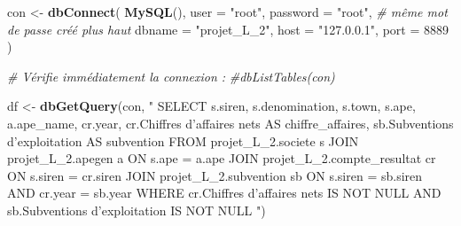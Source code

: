 \documentclass[mstat,12pt]{unswthesis}
\newenvironment{Shaded}{\begin{snugshade}}{\end{snugshade}}
\newcommand{\AttributeTok}[1]{\textcolor[rgb]{0.13,0.29,0.53}{#1}}
\newcommand{\CommentTok}[1]{\textcolor[rgb]{0.56,0.35,0.01}{\textit{#1}}}
\newcommand{\DecValTok}[1]{\textcolor[rgb]{0.00,0.00,0.81}{#1}}
\newcommand{\FunctionTok}[1]{\textcolor[rgb]{0.13,0.29,0.53}{\textbf{#1}}}
\newcommand{\NormalTok}[1]{#1}
\newcommand{\OtherTok}[1]{\textcolor[rgb]{0.56,0.35,0.01}{#1}}
\newcommand{\StringTok}[1]{\textcolor[rgb]{0.31,0.60,0.02}{#1}}
\begin{document}
\begin{Shaded}
\begin{Highlighting}[]
\NormalTok{con }\OtherTok{\textless{}{-}} \FunctionTok{dbConnect}\NormalTok{(}
  \FunctionTok{MySQL}\NormalTok{(),}
  \AttributeTok{user =} \StringTok{"root"}\NormalTok{,}
  \AttributeTok{password =} \StringTok{"root"}\NormalTok{, }\CommentTok{\# même mot de passe créé plus haut}
  \AttributeTok{dbname =} \StringTok{"projet\_L\_2"}\NormalTok{,}
  \AttributeTok{host =} \StringTok{"127.0.0.1"}\NormalTok{,}
  \AttributeTok{port =} \DecValTok{8889}
\NormalTok{)}

\CommentTok{\# Vérifie immédiatement la connexion :}
\CommentTok{\#dbListTables(con)}

\NormalTok{df }\OtherTok{\textless{}{-}} \FunctionTok{dbGetQuery}\NormalTok{(con, }\StringTok{"}
\StringTok{SELECT}
\StringTok{    s.siren,}
\StringTok{    s.denomination,}
\StringTok{    s.town,}
\StringTok{    s.ape,}
\StringTok{    a.ape\_name,}
\StringTok{    cr.year,}
\StringTok{    cr.\textasciigrave{}Chiffres d’affaires nets\textasciigrave{} AS chiffre\_affaires,}
\StringTok{    sb.\textasciigrave{}Subventions d’exploitation\textasciigrave{} AS subvention}
\StringTok{FROM projet\_L\_2.societe s}
\StringTok{JOIN projet\_L\_2.apegen a}
\StringTok{  ON s.ape = a.ape}
\StringTok{JOIN projet\_L\_2.compte\_resultat cr}
\StringTok{  ON s.siren = cr.siren}
\StringTok{JOIN projet\_L\_2.subvention sb}
\StringTok{  ON s.siren = sb.siren AND cr.year = sb.year}
\StringTok{WHERE cr.\textasciigrave{}Chiffres d’affaires nets\textasciigrave{} IS NOT NULL}
\StringTok{  AND sb.\textasciigrave{}Subventions d’exploitation\textasciigrave{} IS NOT NULL}
\StringTok{"}\NormalTok{)}
\end{Highlighting}
\end{Shaded}

\normalsize

\newpage
\end{document}
